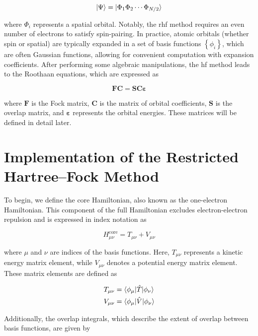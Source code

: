 \begin{equation}
\ket{\Psi}=\ket{\Phi_1\Phi_2\cdots\Phi_{N/2}}
\end{equation}

where \(\Phi_i\) represents a spatial orbital. Notably, the \acrshort{rhf} method requires an even number of electrons to satisfy spin-pairing. In practice, atomic orbitals (whether spin or spatial) are typically expanded in a set of basis functions \(\left\lbrace\phi_i\right\rbrace\), which are often Gaussian functions, allowing for convenient computation with expansion coefficients. After performing some algebraic manipulations, the \acrshort{hf} method leads to the Roothaan equations, which are expressed as

\begin{equation}\label{eq:roothaan}
\mathbf{FC}=\mathbf{SC}\bm{\varepsilon}
\end{equation}

where \(\mathbf{F}\) is the Fock matrix, \(\mathbf{C}\) is the matrix of orbital coefficients, \(\mathbf{S}\) is the overlap matrix, and \(\bm{\varepsilon}\) represents the orbital energies. These matrices will be defined in detail later.

\section{Implementation of the Restricted Hartree--Fock Method}

To begin, we define the core Hamiltonian, also known as the one-electron Hamiltonian. This component of the full Hamiltonian excludes electron-electron repulsion and is expressed in index notation as

\begin{equation}\label{eq:hamiltonian}
H_{\mu\nu}^{\mathrm{core}}=T_{\mu\nu}+V_{\mu\nu}
\end{equation}

where \(\mu\) and \(\nu\) are indices of the basis functions. Here, \(T_{\mu\nu}\) represents a kinetic energy matrix element, while \(V_{\mu\nu}\) denotes a potential energy matrix element. These matrix elements are defined as

\begin{align}
T_{\mu\nu}&=\braket{\phi_{\mu}|\hat{T}|\phi_{\nu}} \\
V_{\mu\nu}&=\braket{\phi_{\mu}|\hat{V}|\phi_{\nu}}
\end{align}

Additionally, the overlap integrals, which describe the extent of overlap between basis functions, are given by


